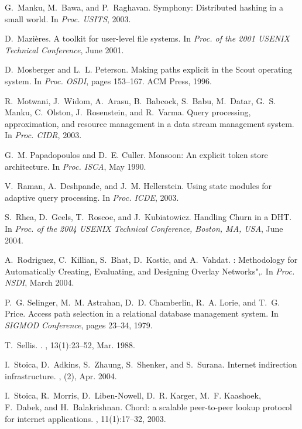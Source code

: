 \begin{thebibliography}{10}
G.~Manku, M.~Bawa, and P.~Raghavan.
\newblock Symphony: Distributed hashing in a small world.
\newblock In {\em Proc. USITS}, 2003.

D.~Mazi\`eres.
\newblock A toolkit for user-level file systems.
\newblock In {\em Proc. of the 2001 USENIX Technical Conference}, June 2001.

D.~Mosberger and L.~L. Peterson.
\newblock Making paths explicit in the {S}cout operating system.
\newblock In {\em Proc. OSDI}, pages 153--167. ACM Press, 1996.

R.~Motwani, J.~Widom, A.~Arasu, B.~Babcock, S.~Babu, M.~Datar, G.~S. Manku,
  C.~Olston, J.~Rosenstein, and R.~Varma.
\newblock Query processing, approximation, and resource management in a data
  stream management system.
\newblock In {\em Proc. CIDR}, 2003.

G.~M. Papadopoulos and D.~E. Culler.
\newblock Monsoon: An explicit token store architecture.
\newblock In {\em Proc. ISCA}, May 1990.

V.~Raman, A.~Deshpande, and J.~M. Hellerstein.
\newblock Using state modules for adaptive query processing.
\newblock In {\em Proc. ICDE}, 2003.

S.~Rhea, D.~Geels, T.~Roscoe, and J.~Kubiatowicz.
\newblock Handling {C}hurn in a {DHT}.
\newblock In {\em Proc. of the 2004 USENIX Technical Conference, Boston, MA,
  USA}, June 2004.

A.~Rodriguez, C.~Killian, S.~Bhat, D.~Kostic, and A.~Vahdat.
: {M}ethodology for {A}utomatically {C}reating,
  {E}valuating, and {D}esigning {O}verlay {N}etworks",.
\newblock In {\em Proc. NSDI}, March 2004.

P.~G. Selinger, M.~M. Astrahan, D.~D. Chamberlin, R.~A. Lorie, and T.~G. Price.
\newblock Access path selection in a relational database management system.
\newblock In {\em SIGMOD Conference}, pages 23--34, 1979.

T.~Sellis.
.
, 13(1):23--52, Mar. 1988.

I.~Stoica, D.~Adkins, S.~Zhaung, S.~Shenker, and S.~Surana.
\newblock Internet indirection infrastructure.
, (2), Apr. 2004.

I.~Stoica, R.~Morris, D.~Liben-Nowell, D.~R. Karger, M.~F. Kaashoek, F.~Dabek,
  and H.~Balakrishnan.
\newblock Chord: a scalable peer-to-peer lookup protocol for internet
  applications.
, 11(1):17--32, 2003.


\end{thebibliography}
